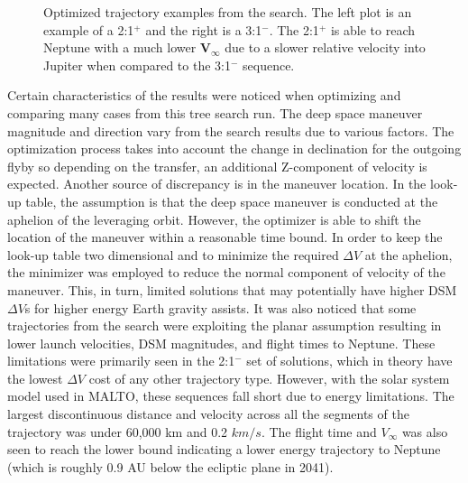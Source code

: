 \documentclass[letterpaper, paper,11pt]{AAS}	%
\newcommand*\circled[1]{\tikz[baseline=(char.base)]{
            \node[shape=circle,draw,inner sep=0.8pt] (char) {#1};}}
\begin{document}
\begin{figure}[htb]
\begin{subfigure}
    \end{subfigure}
    \caption{Optimized trajectory examples from the search. The left plot is an example of a 2:1$^{+}$ and the right is a 3:1$^{-}$. The 2:1$^{+}$ is able to reach Neptune with a much lower $\boldsymbol{V_\infty}$ due to a slower relative velocity into Jupiter when compared to the 3:1$^{-}$ sequence.}
    \label{fig:maltotriton}
\end{figure}

Certain characteristics of the results were noticed when optimizing and comparing many cases from this tree search run. The deep space maneuver magnitude and direction vary from the search results due to various factors. The optimization process takes into account the change in declination for the outgoing flyby so depending on the transfer, an additional Z-component of velocity is expected. Another source of discrepancy is in the maneuver location. In the look-up table, the assumption is that the deep space maneuver is conducted at the aphelion of the leveraging orbit. However, the optimizer is able to shift the location of the maneuver within a reasonable time bound. In order to keep the look-up table two dimensional and to minimize the required $\Delta V$ at the aphelion, the minimizer was employed to reduce the normal component of velocity of the maneuver. This, in turn, limited solutions that may potentially have higher DSM $\Delta V$s for higher energy Earth gravity assists. It was also noticed that some trajectories from the search were exploiting the planar assumption resulting in lower launch velocities, DSM magnitudes, and flight times to Neptune. These limitations were primarily seen in the 2:1$^{-}$ set of solutions, which in theory have the lowest $\Delta V$ cost of any other trajectory type. However, with the solar system model used in MALTO, these sequences fall short due to energy limitations. The largest discontinuous distance and velocity across all the segments of the trajectory was under 60,000 km and 0.2 $km/s$. The flight time and $V_\infty$ was also seen to reach the lower bound indicating a lower energy trajectory to Neptune (which is roughly 0.9 AU below the ecliptic plane in 2041).
\end{document}
